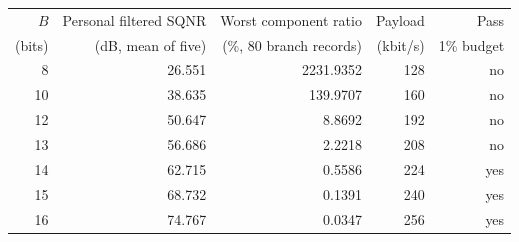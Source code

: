 \begin{tabular}{rrrrr}
\toprule
$B$ & Personal filtered SQNR & Worst component ratio & Payload & Pass \\
(bits) & (dB, mean of five) & (\%, 80 branch records) & (kbit/s) & 1\% budget \\
\midrule
8 & 26.551 & 2231.9352 & 128 & no \\
10 & 38.635 & 139.9707 & 160 & no \\
12 & 50.647 & 8.8692 & 192 & no \\
13 & 56.686 & 2.2218 & 208 & no \\
14 & 62.715 & 0.5586 & 224 & yes \\
15 & 68.732 & 0.1391 & 240 & yes \\
16 & 74.767 & 0.0347 & 256 & yes \\
\bottomrule
\end{tabular}
